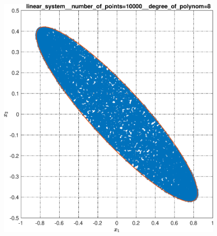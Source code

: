 \documentclass[../main.tex]{subfiles}
\begin{document}
\begin{figure}[ht!]
\begin{minipage}[b]{.3\linewidth}
  	\end{minipage} 
  	\vfill
  	\hspace{-2.5ex}
  	\begin{minipage}[b]{.3\linewidth} 
  		\small
  		\centering 
  		\includegraphics[width=\linewidth]{images/linear_system__number_of_points=10000__degree_of_polynom=8.eps}
  	\end{minipage}
  	\hfill
  	\begin{minipage}[b]{.3\linewidth} 
  		\small
  		\centering

\end{minipage}
\end{figure}
\end{document}
